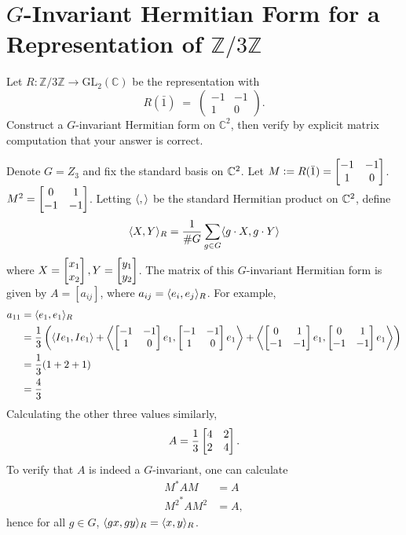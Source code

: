 \documentclass[12pt]{article}
\begin{document}

\section{$G$-Invariant Hermitian Form for a Representation of $\mathbb{Z}/3\mathbb{Z}$}

Let $R \colon \mathbb{Z}/3\mathbb{Z} \to \mathrm{GL}_2(\mathbb{C})$ be the
representation with
\[
  R(\bar{1}) \;=\; \begin{pmatrix} -1 & -1 \\ 1 & 0 \end{pmatrix}.
\]
Construct a $G$-invariant Hermitian form on $\mathbb{C}^2$, then verify by
explicit matrix computation that your answer is correct.

\noindent\dotfill

Denote $G = Z_3$ and fix the standard basis on $\mathbb{C}^2$. 
Let $M \vcentcolon= R(\bar{1}) =  \begin{bmatrix}-1 & -1 \\ 1 & 0\end{bmatrix}$. 
$M^2 = \begin{bmatrix}0 & 1 \\ -1 & -1\end{bmatrix}$. 
Letting $\langle, \rangle$ be the standard Hermitian product on $\mathbb{C}^2$, define 
\begin{align*}
  \langle X, Y\rangle_R & = \frac{1}{\#G}\sum_{g \in G}\langle g \cdot X, g \cdot Y\rangle \\ 
\end{align*}
where $X = \begin{bmatrix}x_1 \\ x_2\end{bmatrix}, Y = \begin{bmatrix}y_1 \\ y_2\end{bmatrix}$. 
The matrix of this $G$-invariant Hermitian form is given by $A = [a_{ij}]$, where $a_{ij} = \langle e_i, e_j\rangle_R$.
For example, 
\begin{align*}
  a_{11} & = \langle e_1, e_1\rangle_R \\ 
         & = \frac{1}{3} \left( \langle I e_1, I e_1\rangle + \left\langle \begin{bmatrix}-1 & -1 \\ 1 & 0\end{bmatrix} e_1, \begin{bmatrix}-1 & -1 \\ 1 & 0\end{bmatrix} e_1 \right\rangle + \left\langle \begin{bmatrix}0 & 1 \\ -1 & -1\end{bmatrix} e_1, \begin{bmatrix}0 & 1 \\ -1 & -1\end{bmatrix} e_1 \right\rangle \right) \\ 
         & = \frac{1}{3}(1 + 2 + 1) \\ 
         & = \frac{4}{3}
\end{align*}
Calculating the other three values similarly, 
$$A = \frac{1}{3} \begin{bmatrix}4 & 2 \\ 2 & 4\end{bmatrix}.$$ 
To verify that $A$ is indeed a $G$-invariant, one can calculate 
\begin{align*}
  M^{*}AM  & = A \\ 
  {M^2}^{*} A M^2 & = A, 
\end{align*}
hence for all $g \in G$, $\langle g x, g y\rangle_R = \langle x, y\rangle_R$. 
\end{document}
